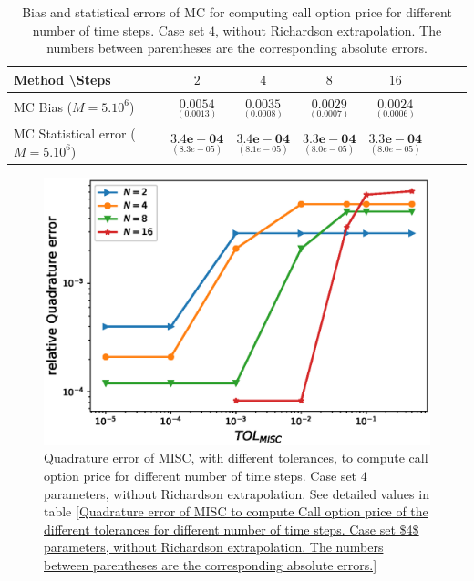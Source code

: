 \begin{table}[h!]
	\centering
	\begin{tabular}{l*{6}{c}r}
		Method \textbackslash  Steps            & $2$ & $4$ & $8$ & $16$  \\
		\hline
		MC Bias ($M=5.10^6$)   & 	$ \underset{(    0.0013)}{\mathbf{0.0054}}$  & $\underset{(0.0008)}{\mathbf{0.0035
		}}$  & $\underset{(0.0007)}{\mathbf{0.0029}}$ & $\underset{(0.0006)}{\mathbf{0.0024}}$\\ 
		
		MC Statistical error ($M=5.10^6$)  &  $\underset{(   8.3e-05)} {\mathbf{3.4e-04}}$  & $\underset{(8.1e-05)} {\mathbf{3.4e-04}}$  & $\underset{(8.0e-05)} {\mathbf{3.3e-04 }}$ & $\underset{(8.0e-05)} {\mathbf{3.3e-04}}$	\\
		
		\hline
	\end{tabular}
	\caption{Bias and statistical errors of MC   for computing call option price  for different number of time steps. Case set $4$, without Richardson extrapolation. The numbers between parentheses are the corresponding absolute errors.}
	\label{Bias and Statistical errors of MC ($M=5.10^6$)  for computing Call option price  for different number of time steps. Case set 4, without Richardson extrapolation. The numbers between parentheses are the corresponding absolute errors.}
\end{table}


\FloatBarrier


\begin{figure}[h!]
	\centering
	\includegraphics[width=0.4\linewidth]{./figures/rBergomi_MISC_quadratre_error/vs_TOL/set6/relative_quad_error_wrt_MISC_TOL_set6_non_rich}
	
	
	\caption{Quadrature error of MISC, with different tolerances, to compute call option price  for different number of time steps. Case  set $4$ parameters, without Richardson extrapolation.  See detailed values  in table \ref{Quadrature error of MISC to compute Call option price of the different tolerances for different number of time steps. Case  set $4$ parameters, without Richardson extrapolation. The numbers between parentheses are the corresponding absolute errors.}}
	\label{fig:Quadrature_error_set4}
\end{figure}



